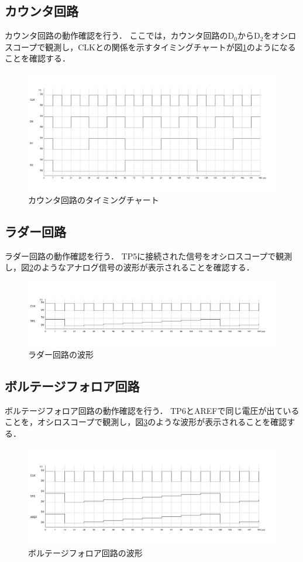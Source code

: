 \documentclass[a4paper,11pt,dvipdfmx]{jsarticle}
\begin{document}
\subsection{カウンタ回路}
カウンタ回路の動作確認を行う．
ここでは，カウンタ回路の$\text{D}_0$から$\text{D}_2$をオシロスコープで観測し，CLKとの関係を示すタイミングチャートが図\ref{fig:counter}のようになることを確認する．

\begin{figure}[H]
  \centering
  \includegraphics[width=0.8\linewidth]{./images/count.png}
  \caption{カウンタ回路のタイミングチャート}
  \label{fig:counter}
\end{figure}

\subsection{ラダー回路}
ラダー回路の動作確認を行う．
TP5に接続された信号をオシロスコープで観測し，図\ref{fig:ladder}のようなアナログ信号の波形が表示されることを確認する．

\begin{figure}[H]
  \centering
  \includegraphics[width=0.8\linewidth]{./images/TP5.png}
  \caption{ラダー回路の波形}
  \label{fig:ladder}
\end{figure}

\subsection{ボルテージフォロア回路}
ボルテージフォロア回路の動作確認を行う．
TP6とAREFで同じ電圧が出ていることを，オシロスコープで観測し，図\ref{fig:voltagefollower}のような波形が表示されることを確認する．

\begin{figure}[H]
  \centering
  \includegraphics[width=0.8\linewidth]{./images/AREF.png}
  \caption{ボルテージフォロア回路の波形}
  \label{fig:voltagefollower}
\end{figure}
\end{document}
